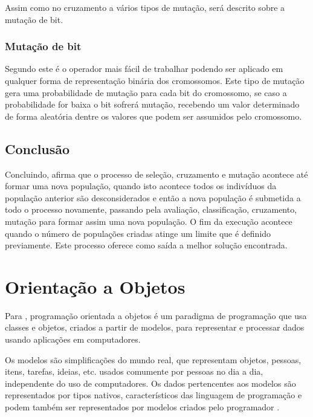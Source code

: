 \par Assim como no cruzamento a vários tipos de mutação, será descrito sobre a
mutação de bit.

\subsubsection{Mutação de bit}

\par Segundo  este é o operador
mais fácil de trabalhar podendo ser aplicado em qualquer forma de representação
binária dos cromossomos. Este tipo de mutação gera uma probabilidade de mutação
para cada bit do cromossomo, se caso a probabilidade for baixa o bit sofrerá
mutação, recebendo um valor determinado de forma aleatória dentre os valores que
podem ser assumidos pelo cromossomo.

\subsection{Conclusão}

\par Concluindo,  afirma que o processo de 
seleção, cruzamento e mutação acontece até formar uma nova população, 
quando isto acontece todos os indivíduos da população anterior são
desconsiderados e então a nova população é submetida a todo o processo
novamente, passando pela avaliação, classificação, cruzamento, mutação para
formar assim uma nova população. O fim da execução acontece quando o
número de populações criadas atinge um limite que é definido previamente.
Este processo oferece como saída a melhor solução encontrada.

\section{Orientação a Objetos}

\par Para ,
programação orientada a objetos é um paradigma de programação que usa
classes e objetos, criados a partir de modelos, para representar e processar
dados usando aplicações em computadores.

\par Os modelos são simplificações do mundo real, que representam
objetos, pessoas, itens, tarefas, ideias, etc. usados comumente por
pessoas no dia a dia, independente do uso de computadores. 
Os dados pertencentes aos modelos são representados por tipos nativos,
característicos das linguagem de programação e podem também ser representados
por modelos criados pelo
programador \cite{livro_intro_a_prog_orientada_objetos_usando_java}.

